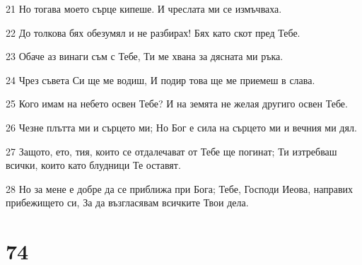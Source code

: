 \par 21 Но тогава моето сърце кипеше. И чреслата ми се измъчваха.
\par 22 До толкова бях обезумял и не разбирах! Бях като скот пред Тебе.
\par 23 Обаче аз винаги съм с Тебе, Ти ме хвана за дясната ми ръка.
\par 24 Чрез съвета Си ще ме водиш, И подир това ще ме приемеш в слава.
\par 25 Кого имам на небето освен Тебе? И на земята не желая другиго освен Тебе.
\par 26 Чезне плътта ми и сърцето ми; Но Бог е сила на сърцето ми и вечния ми дял.
\par 27 Защото, ето, тия, които се отдалечават от Тебе ще погинат; Ти изтребваш всички, които като блудници Те оставят.
\par 28 Но за мене е добре да се приближа при Бога; Тебе, Господи Иеова, направих прибежището си, За да възгласявам всичките Твои дела.

\chapter{74}

